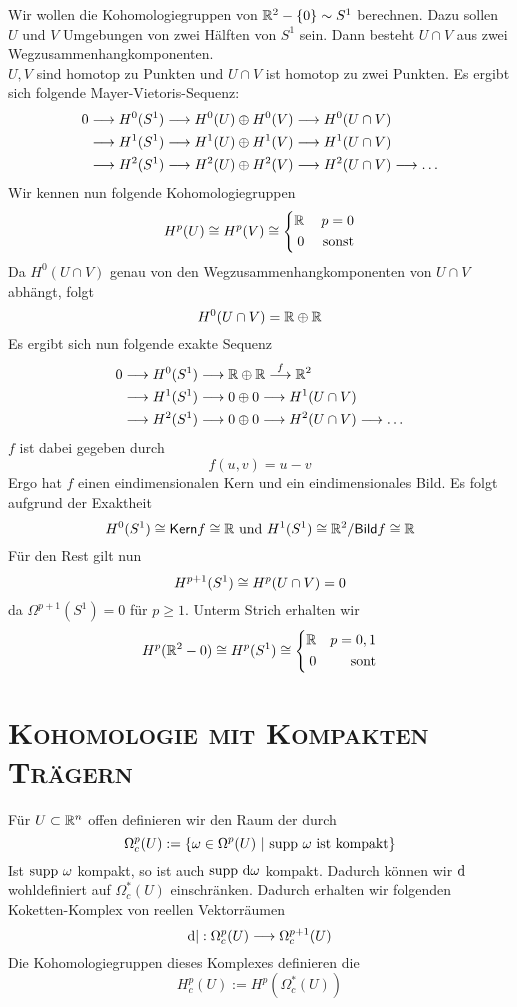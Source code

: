\Bsp{}
Wir wollen die Kohomologiegruppen von $\mathbb{R}^2-\{0\} \sim S^1$ berechnen. Dazu sollen $U$ und $V$ Umgebungen von zwei Hälften von $S^1$ sein. Dann besteht $U\cap V$ aus zwei Wegzusammenhangkomponenten.\\
$U,V$ sind homotop zu Punkten und $U\cap V$ ist homotop zu zwei Punkten. Es ergibt sich folgende Mayer-Vietoris-Sequenz:
\begin{align*}
0\overset{}{\longrightarrow}H^0(S^1) & \overset{}{\longrightarrow} H^0(U) \oplus H^0(V) \overset{}{\longrightarrow} H^0(U\cap V) \\
\overset{}{\longrightarrow}  H^1(S^1) & \overset{}{\longrightarrow} H^1(U) \oplus H^1(V) \overset{}{\longrightarrow}  H^1(U\cap V)\\
 \overset{}{\longrightarrow}  H^2(S^1) & \overset{}{\longrightarrow} H^2(U) \oplus H^2(V) \overset{}{\longrightarrow}  H^2(U\cap V)\overset{}{\longrightarrow} \ldots
\end{align*}
Wir kennen nun folgende Kohomologiegruppen
\[
H^p(U) \overset{}{\cong} H^p(V)\overset{}{\cong}
\left\lbrace
\begin{aligned}
\mathbb{R} && p = 0\\
0 && \text{ sonst}
\end{aligned}
\right.
\]
Da $H^0(U\cap V)$ genau von den Wegzusammenhangkomponenten von $U\cap V$ abhängt, folgt
\[ H^0(U\cap V) = \mathbb{R} \oplus \mathbb{R} \]
Es ergibt sich nun folgende exakte Sequenz
\begin{align*}
0\overset{}{\longrightarrow}H^0(S^1) & \overset{}{\longrightarrow} \mathbb{R} \oplus \mathbb{R} \overset{f}{\longrightarrow} \mathbb{R}^2 \\
\overset{}{\longrightarrow}  H^1(S^1) & \overset{}{\longrightarrow} 0 \oplus 0 \overset{}{\longrightarrow}  H^1(U\cap V)\\
\overset{}{\longrightarrow}  H^2(S^1) & \overset{}{\longrightarrow} 0 \oplus 0 \overset{}{\longrightarrow}  H^2(U\cap V)\overset{}{\longrightarrow} \ldots
\end{align*}
$f$ ist dabei gegeben durch
\[ f(u,v) = u - v \]
Ergo hat $f$ einen eindimensionalen Kern und ein eindimensionales Bild. Es folgt aufgrund der Exaktheit
\[ H^0(S^1) \overset{}{\cong} \textsf{Kern} f \overset{}{\cong}\mathbb{R} \text{ und } H^1(S^1) \overset{}{\cong}  \mathbb{R}^2 / \textsf{Bild} f \overset{}{\cong} \mathbb{R} \]
Für den Rest gilt nun
\[ H^{p+1}(S^1) \overset{}{\cong} H^p(U\cap V) = 0 \]
da $\Omega^{p+1}(S^1) = 0$ für $p\geq 1$. Unterm Strich erhalten wir
\[
H^p(\mathbb{R}^2 - 0) \overset{}{\cong} H^p(S^1) \overset{}{\cong} 
\left\lbrace
\begin{aligned}
\mathbb{R} && p = 0, 1\\
0 && \text{ sont}
\end{aligned}
\right.
\]

\chapter{\textsc{Kohomologie mit Kompakten Trägern}}
\Def{}
Für $U \subset \mathbb{R}^n$ offen definieren wir den Raum der  durch
\[ \Omega_c^p(U) := \set{\omega \in \Omega^p(U)}{\supp\ \omega \text{ ist kompakt}} \]
Ist $\text{supp}\ \omega$ kompakt, so ist auch $\text{supp}\ \text{d} \omega$ kompakt. Dadurch können wir $\text{d}$ wohldefiniert auf $\Omega^*_c(U)$ einschränken. Dadurch erhalten wir folgenden Koketten-Komplex von reellen Vektorräumen
\[ \text{d}| : \Omega_c^p(U) \overset{}{\longrightarrow} \Omega_c^{p+1}(U) \]
Die Kohomologiegruppen dieses Komplexes definieren die 
\[ H^p_c(U) := H^p(\Omega^*_c(U)) \]

